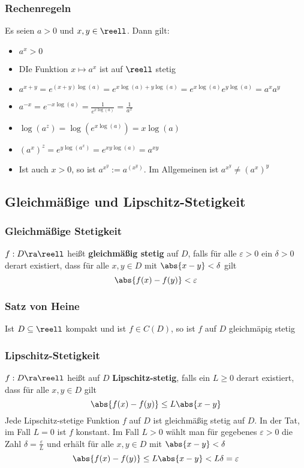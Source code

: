 \documentclass{kit}
\begin{document}
    \subsubsection{Rechenregeln}
      Es seien $a>0$ und $x,y\in\reell$. Dann gilt:
      \begin{itemize}
        \item $a^x>0$
        \item DIe Funktion $x\mapsto a^x$ ist auf $\reell$ stetig
        \item $a^{x+y}=e^{(x+y)\log(a)}=e^{x\log(a)+y\log(a)}=e^{x\log(a)}e^{y\log(a)}=a^xa^y$
        \item $a^{-x}=e^{-x\log(a)}=\frac{1}{e^{x\log(a)}}=\frac{1}{a^x}$
        \item $\log(a^z)=\log(e^{x\log(a)})=x\log(a)$
        \item $(a^x)^z=e^{y\log(a^x)}=e^{xy\log(a)}=a^{xy}$
        \item Ist auch $x>0$, so ist $a^{x^y}:=a^{(x^y)}$. Im Allgemeinen ist $a^{x^y}\neq(a^x)^y$
      \end{itemize}
  \subsection{Gleichmäßige und Lipschitz-Stetigkeit}
    \subsubsection{Gleichmäßige Stetigkeit}
      $f:D\ra\reell$ heißt \textbf{gleichmäßig stetig} auf $D$, falls für alle $\varepsilon>0$ ein $\delta>0$ derart existiert, dass für alle $x,y\in D$ mit $\abs{x-y}<\delta$ gilt
      $$\abs{f(x)-f(y)}<\varepsilon$$
    \subsubsection{Satz von Heine}
      Ist $D\subseteq\reell$ kompakt und ist $f\in C(D)$, so ist $f$ auf $D$ gleichmäpig stetig
    \subsubsection{Lipschitz-Stetigkeit}
      $f:D\ra\reell$ heißt auf $D$ \textbf{Lipschitz-stetig}, falls ein $L\ge0$ derart existiert, dass für alle $x,y\in D$ gilt
      $$\abs{f(x)-f(y)}\le L\abs{x-y}$$
      Jede Lipschitz-stetige Funktion $f$ auf $D$ ist gleichmäßig stetig auf $D$. In der Tat, im Fall $L=0$ ist $f$ konstant. 
      Im Fall $L>0$ wählt man für gegebenes $\varepsilon>0$ die Zahl $\delta=\frac{\varepsilon}{L}$ und erhält für alle $x,y\in D$ mit $\abs{x-y}<\delta$
      $$\abs{f(x)-f(y)}\le L\abs{x-y}<L\delta=\varepsilon$$
\end{document}
